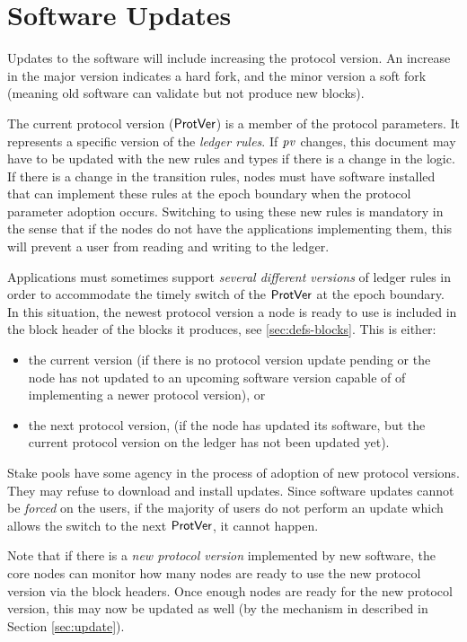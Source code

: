 \section{Software Updates}
\label{sec:software-updates}

Updates to the software will include increasing the protocol version.
An increase in the major version indicates a hard fork, and the minor version a soft fork
(meaning old software can validate but not produce new blocks).

The current protocol version ($\mathsf{ProtVer}$) is a member of the protocol parameters.
It represents a specific version of the \textit{ledger rules}.
If $\mathit{pv}$ changes, this document may have to be updated with
the new rules and types if there is a change in the logic.
If there is a change in the transition rules, nodes must have
software installed that can implement these rules at the epoch boundary
when the protocol parameter adoption occurs.
Switching to using these new rules is mandatory in the sense that
if the nodes do not have the applications implementing them, this
will prevent a user from reading and writing to the ledger.

Applications must sometimes support \textit{several different versions}
of ledger rules in order to accommodate the timely switch of the $\mathsf{ProtVer}$ at the epoch boundary.
In this situation, the newest protocol version a node is ready to use is included in the block
header of the blocks it produces, see \ref{sec:defs-blocks}. This is either:

\begin{itemize}
\item the current version (if there is no protocol version update pending or the node
has not updated to an upcoming software version capable of of implementing a
newer protocol version), or
\item the next protocol version,
(if the node has updated its software, but the current protocol version on the
ledger has not been updated yet).
\end{itemize}

Stake pools have some agency in the process of adoption of
new protocol versions. They may refuse to download and install updates.
Since software updates cannot be \textit{forced} on the users, if the majority of
users do not perform an update which allows the switch to the next $\mathsf{ProtVer}$,
it cannot happen.

Note that if there is a \textit{new protocol version} implemented by new
software, the core nodes can monitor how many nodes are ready to use the new
protocol version via the block headers.
Once enough nodes are ready for the new protocol version, this
may now be updated as well (by the mechanism in described in 
Section \ref{sec:update}).
